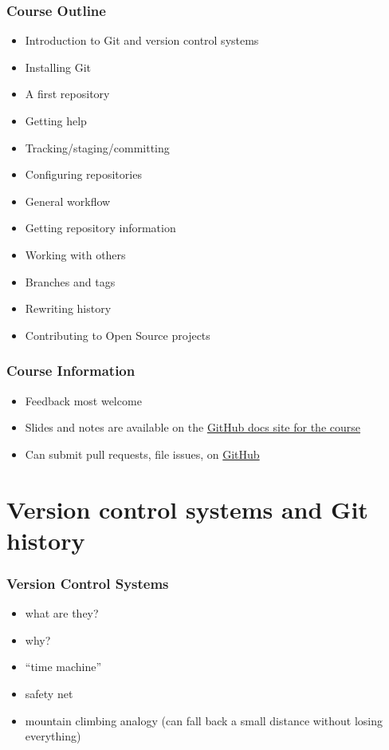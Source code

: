 \documentclass{git_course}
\begin{document}
\begin{frame}
\frametitle{Course Outline}
\begin{itemize}
    \item Introduction to Git and version control systems
    \item Installing Git
    \item A first repository
    \item Getting help
    \item Tracking/staging/committing
    \item Configuring repositories
    \item General workflow
    \item Getting repository information
    \item Working with others
    \item Branches and tags
    \item Rewriting history
    \item Contributing to Open Source projects
\end{itemize}
\end{frame}

\begin{frame}
\frametitle{Course Information}
\begin{itemize}
    \item Feedback most welcome
    \item Slides and notes are available on the
        \href{https://paultcochrane.github.io/version\_control\_course/}
             {GitHub docs site for the course}
    \item Can submit pull requests, file issues, on
        \href{http://github.com}{GitHub}
\end{itemize}
\end{frame}


\section{Version control systems and Git history}

\begin{frame}
\frametitle{Version Control Systems}
\begin{itemize}
    \item what are they?
    \item why?
    \item ``time machine''
    \item safety net
    \item mountain climbing analogy (can fall back a small distance without
        losing everything)
\end{itemize}
\end{frame}
\end{document}
